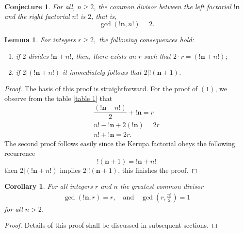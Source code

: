 \documentclass[pdflatex,sn-mathphys-num]{sn-jnl}%
\newtheorem{lemma}{Lemma}
\newtheorem{corollary}{Corollary}
\newtheorem{conjecture}{Conjecture}
\theoremstyle{thmstyleone}%
\theoremstyle{thmstyletwo}%
\theoremstyle{thmstylethree}%
\begin{document}
\begin{conjecture}\label{main}\cite{kurepa1971left, guy2004unsolved, mijajlovic2021fifty}
    For all, $n\geq2$, the common divisor between the left factorial $\mathbf{!n}$ and the right factorial $n!$ is $2$, that is, $$\gcd(\mathbf{!n}, n!)=2.$$

\end{conjecture}


\begin{lemma}\label{induct}
For integers $r\geq 2,$ the following consequences hold:
  \begin{enumerate}
        \item if $2$ divides $\mathbf{!n}+ n!$, then, there exists an $r$ such that $2\cdotp r= (\mathbf{!n}+n!);$
        \item  if $2| (\mathbf{!n}+n!)$ it immediately follows that $2| !(\mathbf{n}+1)$.
    \end{enumerate}
\end{lemma}
\begin{proof}
The basis of this proof is straightforward. For the proof of $(1)$, we observe from the table \ref{table 1} that
\begin{align*}
 \dfrac{(\mathbf{!n}- n!)}{2}+ \mathbf{!n}=r\\
n!- \mathbf{!n} + 2(\mathbf{!n}) =2r\\
n! + \mathbf{!n} =2r. 
\end{align*}
The second proof follows easily since the Kerupa factorial obeys the following recurrence $$ !(\mathbf{n}+1)=\mathbf{!n}+ n!$$ then $2| (\mathbf{!n}+n!)$ implies $2| !(\mathbf{n}+1)$, this finishes the proof.
\end{proof}

\begin{corollary}
    For all integers $r$ and $n$ the greatest common divisor
    \begin{align*}
      \gcd(\mathbf{!n},r)=r,\quad\mbox{and} \quad  
      \gcd\left(r,\frac{n!}{2}\right)=1
    \end{align*}
for all $n>2$.
\end{corollary}
\begin{proof}
    Details of this proof shall be discussed in subsequent sections.
\end{proof}
\end{document}

